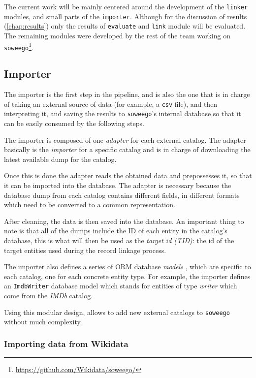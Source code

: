 \documentclass[epsfig,a4paper,11pt,titlepage,twoside,openany]{book}
\newcommand{\footurl}[1]{\footnote{\url{#1}}}
\begin{document}
The current work will be mainly centered around the development of the \texttt{linker} modules, and small parts of the \texttt{importer}. Although for the discussion of results  (\autoref{chap:results}) only the results of  \texttt{evaluate} and \texttt{link} module will be evaluated.  The remaining modules were developed by the rest of the team working on \texttt{soweego}\footurl{https://github.com/Wikidata/soweego/}.


\subsection{Importer}
\label{sec:soweego-st-importer}

The importer is the first step in the pipeline, and is also the one that is in charge of taking an external source of data (for example, a \texttt{csv} file), and then interpreting it, and saving the results to \texttt{soweego}'s internal database so that it can be easily consumed by the following steps.

The importer is composed of one \textit{adapter} for each external catalog. The adapter basically is the \textit{importer} for a specific catalog and is in charge of downloading the latest available dump for the catalog. 


Once this is done the adapter reads the obtained data and prepossesses it, so that it can be imported into the database. The adapter is necessary because the database dump from each catalog contains different fields, in different formats which need to be converted to a common representation. 


After cleaning, the data is then saved into the database. An important thing to note is that all of the dumps include the ID of each entity in the catalog's database, this is what will then be used as the \textit{target id (TID)}: the id of the target entities used during the  record linkage process.

The importer also defines a series of ORM database \textit{models} \cite{sqlalchemy}, which are specific to each catalog, one for each concrete entity type. For example, the importer defines an \texttt{ImdbWriter} database model which stands for entities of type \textit{writer} which come from the \textit{IMDb} catalog.

Using this modular design, allows to add new external catalogs to \texttt{soweego} without much complexity.


\subsubsection{Importing data from Wikidata}
\label{sec:importing-from-wikidata}
\end{document}
